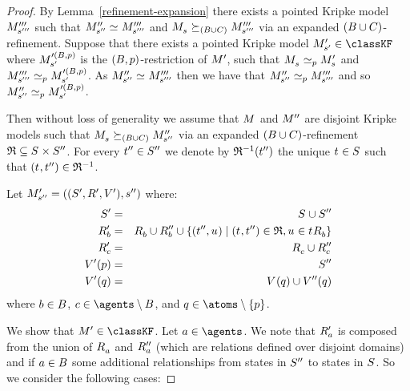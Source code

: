 \begin{proof}
By Lemma~\ref{refinement-expansion} there exists a pointed Kripke model $\kPModelPPP{\kStateSPPP}$ such that $\kPModelPP{\kStateSPP} \bisimilar \kPModelPPP{\kStateSPPP}$ and $\kPModel{\kStateS} \simulates[(\agentsB \cup \agentsC)] \kPModelPPP{\kStateSPPP}$ via an expanded $(\agentsB \cup \agentsC)$-refinement.
Suppose that there exists a pointed Kripke model $\kPModelP{\kStateSP} \in \classKF$ where $\kPModel[\prime(\agentsB, \atomP)]{\kStateSP}$ is the $(\agentsB, \atomP)$-restriction of $\kModelP$, such that $\kPModel{\kStateS} \bisimilar[\atomP] \kPModelP{\kStateS}$ and $\kPModelPPP{\kStateSPPP} \bisimilar[\atomP] \kPModel[\prime(\agentsB, \atomP)]{\kStateSP}$.
As $\kPModelPP{\kStateSPP} \bisimilar \kPModelPPP{\kStateSPPP}$ then we have that $\kPModelPP{\kStateSPP} \bisimilar[\atomP] \kPModelPPP{\kStateSPPP}$ and so $\kPModelPP{\kStateSPP} \bisimilar[\atomP] \kPModel[\prime(\agentsB, \atomP)]{\kStateSP}$.

Then without loss of generality we assume that $\kModel$ and $\kModelPP$ are disjoint Kripke models such that $\kPModel{\kStateS} \simulates[(\agentsB \cup \agentsC)] \kPModelPP{\kStateSPP}$ via an expanded $(\agentsB \cup \agentsC)$-refinement $\refinement \subseteq \kStates \times \kStatesPP$.
For every $\kStateTPP \in \kStatesPP$ we denote by $\refinement^{-1}(\kStateTPP)$ the unique $\kStateT \in \kStates$ such that $(\kStateT, \kStateTPP) \in \refinement^{-1}$.

Let $\kPModelAndTupleP{\kStateSPP}$ where:
\begin{eqnarray*}
    \kStatesP &=& \kStates \cup \kStatesPP\\
    \kAccessibilityPB &=& \kAccessibilityB \cup \kAccessibilityPPB \cup \{(\kStateTPP, \kStateU)  \mid (\kStateT, \kStateTPP) \in \refinement, \kStateU \in \kSuccessorsB{\kStateT}\}\\
    \kAccessibilityPC &=& \kAccessibilityC \cup \kAccessibilityPPC\\
    \kValuationP(\atomP) &=& \kStatesPP\\
    \kValuationP(\atomQ) &=& \kValuation(\atomQ) \cup \kValuationPP(\atomQ)
\end{eqnarray*}
where $\agentB \in \agentsB$, $\agentC \in \agents \setminus \agentsB$, and $\atomQ \in \atoms \setminus \{\atomP\}$.

We show that $\kModelP \in \classKF$.
Let $\agentA \in \agents$.
We note that $\kAccessibilityPA$ is composed from the union of $\kAccessibilityA$ and $\kAccessibilityPPA$ (which are relations defined over disjoint domains) and if $\agentA \in \agentsB$ some additional relationships from states in $\kStatesPP$ to states in $\kStates$.
So we consider the following cases:


\end{proof}
